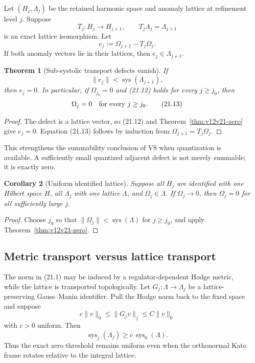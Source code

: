 \documentclass[11pt]{article}
\newtheorem{theorem}{Theorem}[section]
\newtheorem{corollary}[theorem]{Corollary}
\theoremstyle{remark}
\begin{document}
Let \((H_j,\Lambda_j)\) be the retained harmonic space and anomaly
lattice at refinement level \(j\).  Suppose
\[
 T_j:H_j\longrightarrow H_{j+1},\qquad
                         T_j\Lambda_j=\Lambda_{j+1}         \tag{21.10}
\]
is an exact lattice isomorphism.  Let
\[
                         e_j:=\Omega_{j+1}-T_j\Omega_j.      \tag{21.11}
\]
If both anomaly vectors lie in their lattices, then
\(e_j\in\Lambda_{j+1}\).

\begin{theorem}[Sub-systolic transport defects vanish]
\label{thm:v12v21-transport}
If
\[
                         \|e_j\|
 <\operatorname{sys}(\Lambda_{j+1}),                       \tag{21.12}
\]
then \(e_j=0\).  In particular, if \(\Omega_{j_0}=0\) and (21.12)
holds for every \(j\ge j_0\), then
\[
                         \Omega_j=0
 \quad\hbox{for every }j\ge j_0.                           \tag{21.13}
\]
\end{theorem}

\begin{proof}
The defect is a lattice vector, so (21.12) and
Theorem~\ref{thm:v12v21-zero} give \(e_j=0\).
Equation (21.13) follows by induction from
\(\Omega_{j+1}=T_j\Omega_j\).
\end{proof}

This strengthens the summability conclusion of V8 when quantization
is available.  A sufficiently small quantized adjacent defect is
not merely summable; it is exactly zero.

\begin{corollary}[Uniform identified lattice]
\label{cor:v12v21-uniform}
Suppose all \(H_j\) are identified with one Hilbert space \(H\), all
\(\Lambda_j\) with one lattice \(\Lambda\), and
\(\Omega_j\in\Lambda\).  If \(\Omega_j\to0\), then
\(\Omega_j=0\) for all sufficiently large \(j\).
\end{corollary}

\begin{proof}
Choose \(j_0\) so that
\(\|\Omega_j\|<\operatorname{sys}(\Lambda)\) for
\(j\ge j_0\), and apply Theorem~\ref{thm:v12v21-zero}.
\end{proof}

\subsection{Metric transport versus lattice transport}

The norm in (21.1) may be induced by a regulator-dependent Hodge
metric, while the lattice is transported topologically.  Let
\(G_j:\Lambda\to\Lambda_j\) be a lattice-preserving Gauss--Manin
identifier.  Pull the Hodge norm back to the fixed space and suppose
\[
                         c\|v\|_0\le\|G_jv\|_j
 \le C\|v\|_0                                               \tag{21.14}
\]
with \(c>0\) uniform.  Then
\[
                         \operatorname{sys}_j(\Lambda_j)
 \ge c\,\operatorname{sys}_0(\Lambda).                     \tag{21.15}
\]
Thus the exact zero threshold remains uniform even when the
orthonormal Kato frame rotates relative to the integral lattice.
\end{document}
